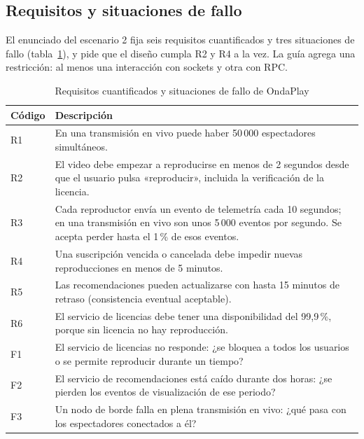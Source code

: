 \subsection{Requisitos y situaciones de fallo}

El enunciado del escenario 2 fija seis requisitos cuantificados y tres
situaciones de fallo (tabla~\ref{tab:requisitos}), y pide que el
diseño cumpla R2 y R4 a la vez. La guía agrega una restricción: al
menos una interacción con sockets y otra con RPC.

\begin{table}[H]
  \centering
  \small
  \caption{Requisitos cuantificados y situaciones de fallo de OndaPlay}
  \label{tab:requisitos}
  \begin{tabularx}{\textwidth}{@{}lX@{}}
    \toprule
    \textbf{Código} & \textbf{Descripción} \\
    \midrule
    R1 & En una transmisión en vivo puede haber 50\,000 espectadores
         simultáneos. \\
    R2 & El video debe empezar a reproducirse en menos de 2 segundos
         desde que el usuario pulsa «reproducir», incluida la
         verificación de la licencia. \\
    R3 & Cada reproductor envía un evento de telemetría cada
         10 segundos; en una transmisión en vivo son unos 5\,000
         eventos por segundo. Se acepta perder hasta el 1\,\% de esos
         eventos. \\
    R4 & Una suscripción vencida o cancelada debe impedir nuevas
         reproducciones en menos de 5 minutos. \\
    R5 & Las recomendaciones pueden actualizarse con hasta 15 minutos
         de retraso (consistencia eventual aceptable). \\
    R6 & El servicio de licencias debe tener una disponibilidad del
         99,9\,\%, porque sin licencia no hay reproducción. \\
    \midrule
    F1 & El servicio de licencias no responde: ¿se bloquea a todos los
         usuarios o se permite reproducir durante un tiempo? \\
    F2 & El servicio de recomendaciones está caído durante dos horas:
         ¿se pierden los eventos de visualización de ese periodo? \\
    F3 & Un nodo de borde falla en plena transmisión en vivo: ¿qué pasa
         con los espectadores conectados a él? \\
    \bottomrule
  \end{tabularx}
\end{table}
